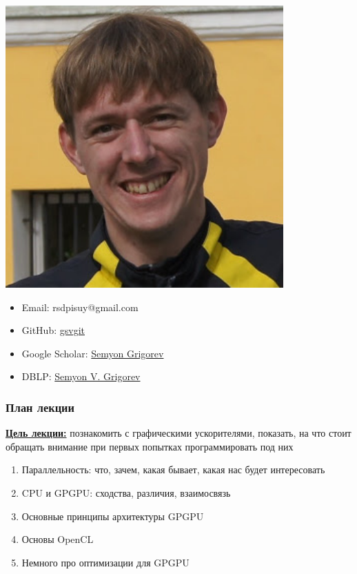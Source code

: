 \documentclass[xcolor=table,aspectratio=169]{beamer}
\begin{document}
\begin{frame}[fragile]
\begin{minipage}{0.70\textwidth}
\end{minipage}
\begin{minipage}[t]{0.29\textwidth}
  \begin{center}
\includegraphics[width=0.8\textwidth]{pictures/SemyonGrigorev.jpg}
  \end{center}
  {\scriptsize
\begin{itemize}    
  \item Email: rsdpisuy@gmail.com 
  \item GitHub: \href{https://github.com/gsvgit}{gsvgit}
  \item Google Scholar: \href{https://scholar.google.com/citations?hl=ru&user=kP4dqUAAAAAJ&view_op=list_works&sortby=pubdate}{Semyon Grigorev}
  \item DBLP: \href{https://dblp.org/pid/181/9903.html}{Semyon V. Grigorev}
\end{itemize}
  }
\end{minipage}
\end{frame}

\begin{frame}[fragile]
  \frametitle{План лекции}
  \underline{\textbf{Цель лекции:}} познакомить с графическими ускорителями, показать, на что стоит обращать внимание при первых попытках программировать под них
  \vfill
  \begin{enumerate}
    \item Параллельность: что, зачем, какая бывает, какая нас будет интересовать
    \item CPU и GPGPU: сходства, различия, взаимосвязь
    \item Основные принципы архитектуры  GPGPU
    \item Основы OpenCL
    \item Немного про оптимизации для GPGPU
  \end{enumerate}
\end{frame}
\end{document}

